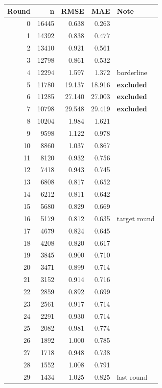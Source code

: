 \documentclass[11pt]{article}
\begin{document}
\bigskip
\begin{longtable}{rrrrl}
\toprule
\textbf{Round} & \textbf{n} & \textbf{RMSE} & \textbf{MAE} & \textbf{Note} \\
\midrule
\endhead
0  & 16445 & 0.638 & 0.263 & \\
1  & 14392 & 0.838 & 0.477 & \\
2  & 13410 & 0.921 & 0.561 & \\
3  & 12798 & 0.861 & 0.532 & \\
4  & 12294 & 1.597 & 1.372 & borderline \\
\rowcolor{red!20}
5  & 11780 & 19.137 & 18.916 & \textbf{excluded} \\
\rowcolor{red!20}
6  & 11285 & 27.140 & 27.003 & \textbf{excluded} \\
\rowcolor{red!20}
7  & 10798 & 29.548 & 29.419 & \textbf{excluded} \\
8  & 10204 & 1.984  & 1.621 & \\
9  &  9598 & 1.122  & 0.978 & \\
10 &  8860 & 1.037  & 0.867 & \\
11 &  8120 & 0.932  & 0.756 & \\
12 &  7418 & 0.943  & 0.745 & \\
13 &  6808 & 0.817  & 0.652 & \\
14 &  6212 & 0.811  & 0.642 & \\
15 &  5680 & 0.829  & 0.669 & \\
16 &  5179 & 0.812  & 0.635 & target round \\
17 &  4679 & 0.824  & 0.645 & \\
18 &  4208 & 0.820  & 0.617 & \\
19 &  3845 & 0.900  & 0.710 & \\
20 &  3471 & 0.899  & 0.714 & \\
21 &  3152 & 0.914  & 0.716 & \\
22 &  2859 & 0.892  & 0.699 & \\
23 &  2561 & 0.917  & 0.714 & \\
24 &  2291 & 0.930  & 0.714 & \\
25 &  2082 & 0.981  & 0.774 & \\
26 &  1892 & 1.000  & 0.785 & \\
27 &  1718 & 0.948  & 0.738 & \\
28 &  1552 & 1.008  & 0.791 & \\
29 &  1434 & 1.025  & 0.825 & last round \\
\bottomrule
\end{longtable}
\end{document}
